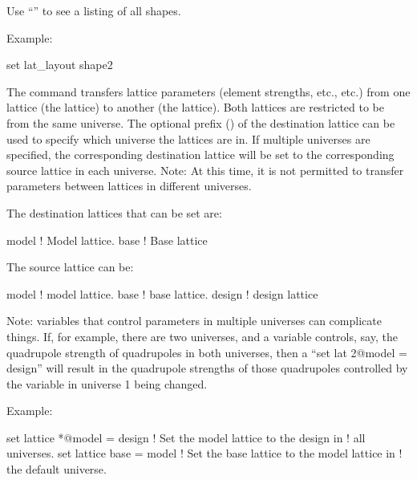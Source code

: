 {{\begin{description}
Use ``'' to see a listing of all shapes. 

Example:
\begin{example}
  set lat_layout shape2%
\end{example}


\item[set lattice \{n@\}<destination\_lat> = <source\_lat>] \Newline

\vskip -0.2in

The  command transfers lattice parameters (element
strengths, etc., etc.) from one lattice (the  lattice) to
another (the  lattice). Both lattices are restricted
to be from the same universe. The optional  prefix
() of the destination lattice can be used to specify
which universe the lattices are in. If multiple universes are
specified, the corresponding destination lattice will be set to the
corresponding source lattice in each universe. Note: At this time, it
is not permitted to transfer parameters between lattices in different
universes.

The destination lattices that can be set are:
\begin{example}
  model      ! Model lattice.
  base       ! Base lattice
\end{example}
The source lattice can be:
\begin{example}
  model       ! model lattice.
  base        ! base lattice.
  design      ! design lattice
\end{example}

Note: \tao variables that control parameters in multiple universes can
complicate things. If, for example, there are two universes, and a
\tao variable controls, say, the quadrupole strength of quadrupoles in
both universes, then a ``set lat 2@model = design'' will result in the
quadrupole strengths of those quadrupoles controlled by the variable
in universe 1 being changed.

Example:
\begin{example}
  set lattice *@model = design  ! Set the model lattice to the design in 
                                !   all universes.
  set lattice base = model      ! Set the base lattice to the model lattice in 
                                !   the default universe.
\end{example}


\end{description}}}
